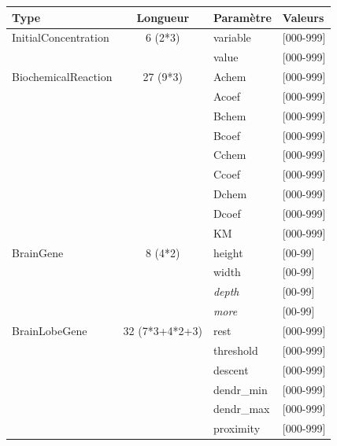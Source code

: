 \documentclass[11pt,twoside,a4paper]{article}
\begin{document}
\clearpage

\begin{table}[h]
	\begin{center} \begin{scriptsize}
	\begin{tabular}{|p{}|c|p{}|p{}|}
\hline
	\rowcolor{lightgray} Type	& Longueur	& Param{\`e}tre	& Valeurs \\ \hline
	InitialConcentration		&	6 (2*3)		&	variable	& [000-999] \\
	\cline{3-4} %
								&				&	value		& [000-999] \\
	\hline \hline
	BiochemicalReaction			&	27 (9*3)	&	Achem		& [000-999] \\
	\cline{3-4} %
								&				&	Acoef		& [000-999] \\
	\cline{3-4} %
								&				&	Bchem		& [000-999] \\
	\cline{3-4} %
								&				&	Bcoef		& [000-999] \\
	\cline{3-4} %
								&				&	Cchem		& [000-999] \\
	\cline{3-4} %
								&				&	Ccoef		& [000-999] \\
	\cline{3-4} %
								&				&	Dchem		& [000-999] \\
	\cline{3-4} %
								&				&	Dcoef		& [000-999] \\
	\cline{3-4} %
								&				&	KM			& [000-999] \\
	\hline \hline
	BrainGene					&	8 (4*2)		&	height		& [00-99] \\
	\cline{3-4} %
								&				&	width		& [00-99] \\
	\cline{3-4} %
								&				&	\textit{depth}	& [00-99] \\
	\cline{3-4} %
								&				&	\textit{more}	& [00-99] \\
	\hline \hline
	BrainLobeGene				& 32 (7*3+4*2+3)&	rest		& [000-999] \\
	\cline{3-4} %
								&				&	threshold	& [000-999] \\
	\cline{3-4} %
								&				&	descent		& [000-999] \\
	\cline{3-4} %
								&				&	dendr\_min	& [000-999] \\
	\cline{3-4} %
								&				&	dendr\_max	& [000-999] \\
	\cline{3-4} %
								&				&	proximity	& [000-999] \\
	\cline{3-4} %

\end{tabular}
\end{scriptsize}
\end{center}
\end{table}
\end{document}
